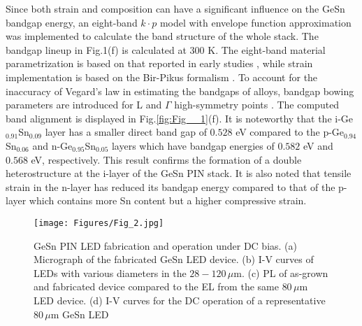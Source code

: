 \bigskip
Since both strain and composition can have a significant influence on the GeSn bandgap energy, an eight-band $k\cdot p$ model with envelope function approximation \cite{Bahder1992} was implemented to calculate the band structure of the whole stack. The bandgap lineup in Fig.1(f) is calculated at 300 K. The eight-band \kp{}  material parametrization is based on that reported in early studies \cite{Chang2010,KL2012,Polak_2017}, while strain implementation is based on the Bir-Pikus formalism \cite{PikusBir}. To account for the inaccuracy of Vegard's law in estimating the bandgaps of  alloys, bandgap bowing parameters are introduced for L and $\Gamma$ high-symmetry points \cite{Bertrand2019, Chang2010}. The computed band alignment is displayed in Fig.\ref{fig:Fig__1}(f). It is noteworthy that the i-Ge$_{0.91}$Sn$_{0.09}$ layer has a smaller direct band gap of $0.528$ eV compared to the p-Ge$_{0.94}$Sn$_{0.06}$ and n-Ge$_{0.95}$Sn$_{0.05}$ layers which have bandgap energies of $0.582$ eV and $0.568$ eV, respectively. This result confirms the formation of a double heterostructure at the i-layer of the GeSn PIN stack. It is also noted that tensile strain in the n-layer has reduced its bandgap energy compared to that of the p-layer which contains more Sn content but a higher compressive strain.


\bigskip


\begin{figure}[htbp]
\centering
\texttt{[image: Figures/Fig\_2.jpg]}
\caption{GeSn PIN LED fabrication and operation under DC bias. (a) Micrograph of the fabricated GeSn LED device. (b) I-V curves of LEDs with various diameters in the $28-120 \, \mu$m. (c) PL of as-grown and fabricated device compared to the EL from the same $80 \, \mu$m LED device. (d) I-V curves for the DC operation of a representative $80 \, \mu$m GeSn LED}
\label{fig:Fig__2}
\end{figure}



\bigskip

